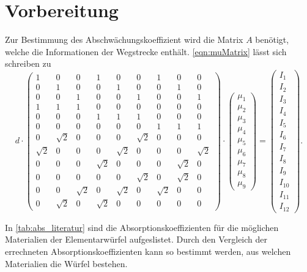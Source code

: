 \section{Vorbereitung}
\label{sec:Vorbereitung}
Zur Bestimmung des Abschwächungskoeffizient wird die Matrix $A$ benötigt, welche die Informationen der Wegstrecke enthält. \autoref{eqn:muMatrix} lässt sich schreiben zu
\begin{equation}
    d \cdot
    \begin{pmatrix}
        1 & 0 & 0 & 1 & 0 & 0 & 1 & 0 & 0 \\
        0 & 1 & 0 & 0 & 1 & 0 & 0 & 1 & 0 \\
        0 & 0 & 1 & 0 & 0 & 1 & 0 & 0 & 1 \\
        1 & 1 & 1 & 0 & 0 & 0 & 0 & 0 & 0 \\
        0 & 0 & 0 & 1 & 1 & 1 & 0 & 0 & 0 \\
        0 & 0 & 0 & 0 & 0 & 0 & 1 & 1 & 1 \\
        0 & \sqrt{2} & 0 & 0 & 0 & \sqrt{2} & 0 & 0 & 0 \\
        \sqrt{2} & 0 & 0 & 0 & \sqrt{2} & 0 & 0 & 0 & \sqrt{2} \\
        0 & 0 & 0 & \sqrt{2} & 0 & 0 & 0 & \sqrt{2} & 0 \\
        0 & 0 & 0 & 0 & 0 & \sqrt{2} & 0 & \sqrt{2} & 0 \\
        0 & 0 & \sqrt{2} & 0 & \sqrt{2} & 0 & \sqrt{2} & 0 & 0 \\
        0 & \sqrt{2} & 0 & \sqrt{2} & 0 & 0 & 0 & 0 & 0 
    \end{pmatrix}
    \cdot
    \begin{pmatrix}
        \mu_1 \\
        \mu_2 \\
        \mu_3 \\
        \mu_4 \\
        \mu_5 \\
        \mu_6 \\
        \mu_7 \\
        \mu_8 \\
        \mu_9 
    \end{pmatrix}
    =
    \begin{pmatrix}
        I_1 \\
        I_2 \\
        I_3 \\
        I_4 \\
        I_5 \\
        I_6 \\
        I_7 \\
        I_8 \\
        I_9 \\
        I_{10} \\
        I_{11} \\
        I_{12} 
    \end{pmatrix}
    .
\end{equation}

In \autoref{tab:abs_literatur} sind die Absorptionskoeffizienten für die möglichen Materialien der Elementarwürfel aufgeslistet.
Durch den Vergleich der errechneten Absorptionskoeffizienten kann so bestimmt werden, aus welchen Materialien die Würfel bestehen.
